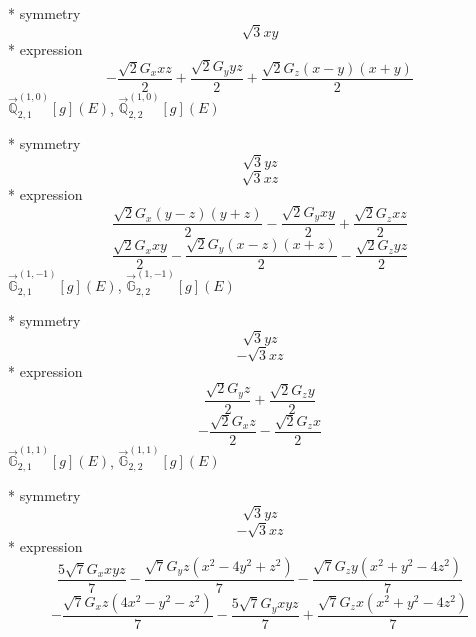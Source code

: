 \documentclass[fleqn,8pt]{jsarticle}
\begin{document}
\noindent\quad ** symmetry
\begin{dmath*}
\sqrt{3} x y
\end{dmath*}
\noindent\quad ** expression
\begin{dmath*}
- \frac{\sqrt{2} G_{x} x z}{2} + \frac{\sqrt{2} G_{y} y z}{2} + \frac{\sqrt{2} G_{z} \left(x - y\right) \left(x + y\right)}{2}
\end{dmath*}
\noindent\quad $\vec{\mathbb{Q}}_{2,1}^{(1,0)}[g](E)$, $\vec{\mathbb{Q}}_{2,2}^{(1,0)}[g](E)$

\noindent\quad ** symmetry
\begin{dmath*}
\sqrt{3} y z
\end{dmath*}
\begin{dmath*}
\sqrt{3} x z
\end{dmath*}
\noindent\quad ** expression
\begin{dmath*}
\frac{\sqrt{2} G_{x} \left(y - z\right) \left(y + z\right)}{2} - \frac{\sqrt{2} G_{y} x y}{2} + \frac{\sqrt{2} G_{z} x z}{2}
\end{dmath*}
\begin{dmath*}
\frac{\sqrt{2} G_{x} x y}{2} - \frac{\sqrt{2} G_{y} \left(x - z\right) \left(x + z\right)}{2} - \frac{\sqrt{2} G_{z} y z}{2}
\end{dmath*}
\noindent\quad $\vec{\mathbb{G}}_{2,1}^{(1,-1)}[g](E)$, $\vec{\mathbb{G}}_{2,2}^{(1,-1)}[g](E)$

\noindent\quad ** symmetry
\begin{dmath*}
\sqrt{3} y z
\end{dmath*}
\begin{dmath*}
- \sqrt{3} x z
\end{dmath*}
\noindent\quad ** expression
\begin{dmath*}
\frac{\sqrt{2} G_{y} z}{2} + \frac{\sqrt{2} G_{z} y}{2}
\end{dmath*}
\begin{dmath*}
- \frac{\sqrt{2} G_{x} z}{2} - \frac{\sqrt{2} G_{z} x}{2}
\end{dmath*}
\noindent\quad $\vec{\mathbb{G}}_{2,1}^{(1,1)}[g](E)$, $\vec{\mathbb{G}}_{2,2}^{(1,1)}[g](E)$

\noindent\quad ** symmetry
\begin{dmath*}
\sqrt{3} y z
\end{dmath*}
\begin{dmath*}
- \sqrt{3} x z
\end{dmath*}
\noindent\quad ** expression
\begin{dmath*}
\frac{5 \sqrt{7} G_{x} x y z}{7} - \frac{\sqrt{7} G_{y} z \left(x^{2} - 4 y^{2} + z^{2}\right)}{7} - \frac{\sqrt{7} G_{z} y \left(x^{2} + y^{2} - 4 z^{2}\right)}{7}
\end{dmath*}
\begin{dmath*}
- \frac{\sqrt{7} G_{x} z \left(4 x^{2} - y^{2} - z^{2}\right)}{7} - \frac{5 \sqrt{7} G_{y} x y z}{7} + \frac{\sqrt{7} G_{z} x \left(x^{2} + y^{2} - 4 z^{2}\right)}{7}
\end{dmath*}
\end{document}
